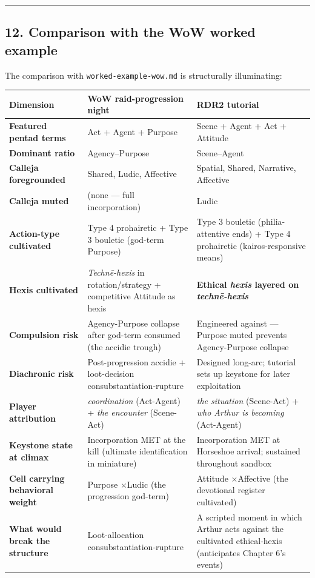 \documentclass[11pt]{report}
\begin{document}
\vspace{0.4em}\hrule\vspace{0.8em}


\subsection{12. Comparison with the WoW worked example}


The comparison with \texttt{worked-\discretionary{}{}{}example-\discretionary{}{}{}wow.\discretionary{}{}{}md} is structurally illuminating:


\begin{table}[H]
\renewcommand{\arraystretch}{1.25}
\begin{tabularx}{\textwidth}{>{\RaggedRight\arraybackslash}X>{\RaggedRight\arraybackslash}X>{\RaggedRight\arraybackslash}X}
\toprule
Dimension & WoW raid-progression night & RDR2 tutorial \\
\midrule
\textbf{Featured pentad terms} & Act + Agent + Purpose & Scene + Agent + Act + Attitude \\
\textbf{Dominant ratio} & Agency–Purpose & Scene–Agent \\
\textbf{Calleja foregrounded} & Shared, Ludic, Affective & Spatial, Shared, Narrative, Affective \\
\textbf{Calleja muted} & (none — full incorporation) & Ludic \\
\textbf{Action-type cultivated} & Type 4 prohairetic + Type 3 bouletic (god-term Purpose) & Type 3 bouletic (philia-attentive ends) + Type 4 prohairetic (kairos-responsive means) \\
\textbf{Hexis cultivated} & \textit{Technē-hexis} in rotation/strategy + competitive Attitude as hexis & \textbf{Ethical \textit{hexis} layered on \textit{technē-hexis}} \\
\textbf{Compulsion risk} & Agency-Purpose collapse after god-term consumed (the accidie trough) & Engineered against — Purpose muted prevents Agency-Purpose collapse \\
\textbf{Diachronic risk} & Post-progression accidie + loot-decision consubstantiation-rupture & Designed long-arc; tutorial sets up keystone for later exploitation \\
\textbf{Player attribution} & \textit{coordination} (Act-Agent) + \textit{the encounter} (Scene-Act) & \textit{the situation} (Scene-Act) + \textit{who Arthur is becoming} (Act-Agent) \\
\textbf{Keystone state at climax} & Incorporation MET at the kill (ultimate identification in miniature) & Incorporation MET at Horseshoe arrival; sustained throughout sandbox \\
\textbf{Cell carrying behavioral weight} & Purpose $\times$\allowbreak  Ludic (the progression god-term) & Attitude $\times$\allowbreak  Affective (the devotional register cultivated) \\
\textbf{What would break the structure} & Loot-allocation consubstantiation-rupture & A scripted moment in which Arthur acts against the cultivated ethical-hexis (anticipates Chapter 6's events) \\
\bottomrule
\end{tabularx}
\end{table}
\end{document}
